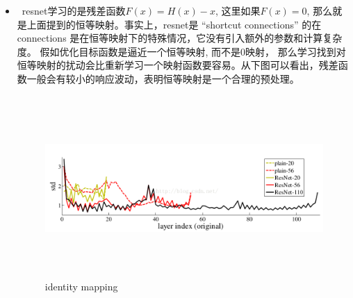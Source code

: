 \documentclass[12pt]{ctexart}%
\begin{document}
\begin{itemize}
			\item  resnet学习的是残差函数$F(x) = H(x) - x$, 这里如果$F(x) = 0$, 那么就是上面提到的恒等映射。事实上，resnet是 “shortcut connections” 的在 connections 是在恒等映射下的特殊情况，它没有引入额外的参数和计算复杂度。 假如优化目标函数是逼近一个恒等映射, 而不是0映射， 那么学习找到对恒等映射的扰动会比重新学习一个映射函数要容易。从下图可以看出，残差函数一般会有较小的响应波动，表明恒等映射是一个合理的预处理。
				\begin{figure}[H]
					\vspace{-0.2cm}  %
					\setlength{\abovecaptionskip}{-0.2cm}   %
					\centering
					\includegraphics[height=6cm,width=14cm]{net.png}
					\renewcommand{\figurename}{Fig} %
					\caption{identity mapping}
					\label{fig20:net}
				\end{figure}
		\end{itemize}
\end{document}
